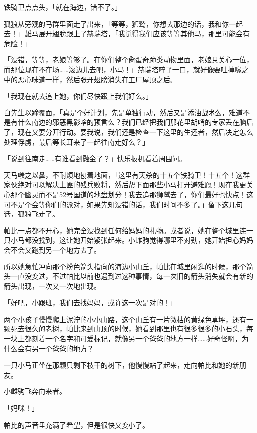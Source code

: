 铁骑卫点点头，「就在海边，错不了。」

孤狼从旁观的马群里面走了出来，「等等，狮鹫，你想去那边的话，我和你一起去！」雄马展开翅膀跟上了赫瑞塔，「我觉得我们应该等等其他马，那里可能会有危险！」

「没错，等等，老娘等够了。在你们整个肏蛋奇蹄类动物里面，老娘只关心一位，而那位现在不在场……滚边儿去吧，小马！」赫瑞塔啐了一口，就好像要吐掉喙之中的恶心味道一样，然后张开翅膀消失在工厂屋顶之后。

「我现在就去追上她，你们尽快跟上我们好么。」

白先生以蹄覆面，「真是个好计划，先是单独行动，然后又是添油战术么，难道不是有什么南边的邪恶黑影啥的预言么？我们已经把我们那花里胡哨的专家丢在脑后了，现在又要分开行动。要我说，我们还是检查一下这里的生还者，然后决定怎么处理俘虏，最后等长耳来了一起往南走好么？」

「说到往南走……有谁看到融金了？」快乐扳机看着周围问。

天马嗤之以鼻，不耐烦地刨着地面，「这里有天杀的十五个铁骑卫！十五个！这群家伙绝对可以解决土匪的残兵败将，然后帮下面那些小马打开避难厩！现在我更关心那个幽灵而不是52号国道的地盘划分！我去追那狮鹫去了，你们最好也快点！这可不是个会等你们的派对，如果先知没错的话，我们时间不多了。」留下这几句话，孤狼飞走了。

\horizonline


帕比一点都不开心，她完全没找到任何给妈妈的礼物。或者说，她在整个城里连一只小马都没找到，这让她开始紧张起来。小雌驹觉得哪里不对劲，她开始担心妈妈会不会又跑到另一个地方去了。

所以她急忙冲向那个粉色箭头指向的海边小山丘，帕比在城里闲逛的时候，那个箭头一直没变过，不过帕比以前也遇到过这种事情，每一次旧的箭头消失就会有新的箭头出现，一次又一次地出现。

「好吧，小跟班，我们去找妈妈，或许这一次是对的！」

两个小孩子慢慢爬上泥泞的小小山路，这个山丘有一片微枯的黄绿色草坪，还有一颗死去很久的老树，帕比来到山顶的时候，她看到那里也有很多很多的小石头，每一块上都刻着一个名字和可爱标记，就像另一个爸爸的地方一样……好奇怪啊，为什么会有另一个爸爸的地方？

一只小马正坐在那颗只剩下枝干的树下，他慢慢站了起来，走向帕比和她的新朋友。

小雌驹飞奔向来者。

「妈咪！」

帕比的声音里充满了希望，但是很快又变小了。

